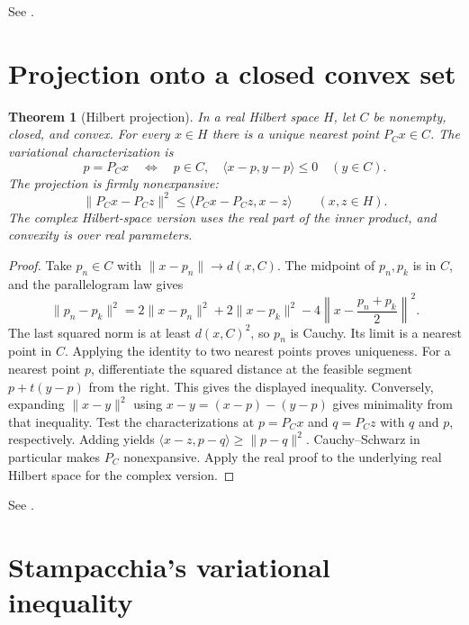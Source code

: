 \documentclass[11pt,oneside,openany]{book}
\theoremstyle{plain}
\newtheorem{theorem}{Theorem}[chapter]
\theoremstyle{definition}
\theoremstyle{remark}
\begin{document}
See \cite[Chapter I, Section 6]{EkelandTemam}.

\section{Projection onto a closed convex set}
\label{v03-05}

\begin{theorem}[Hilbert projection]
\label{thm:hilbert-projection}
In a real Hilbert space \(H\), let \(C\) be nonempty, closed, and convex.
For every \(x\in H\) there is a unique nearest point \(P_C x\in C\).
The variational characterization is
\[
 p=P_Cx
 \quad\Longleftrightarrow\quad
 p\in C,\quad \langle x-p,y-p\rangle\le0\quad(y\in C).
\]
The projection is firmly nonexpansive:
\[
 \|P_Cx-P_Cz\|^2\le \langle P_Cx-P_Cz,x-z\rangle \qquad(x,z\in H).
\]
The complex Hilbert-space version uses the real part of the inner
product, and convexity is over real parameters.
\end{theorem}
\begin{proof}
Take \(p_n\in C\) with \(\|x-p_n\|\to d(x,C)\).
The midpoint of \(p_n,p_k\) is in \(C\), and the parallelogram law gives
\[
 \|p_n-p_k\|^2
 =2\|x-p_n\|^2+2\|x-p_k\|^2
       -4\left\|x-\frac{p_n+p_k}{2}\right\|^2.
\]
The last squared norm is at least \(d(x,C)^2\), so \(p_n\) is Cauchy.
Its limit is a nearest point in \(C\). Applying the identity to two
nearest points proves uniqueness. For a nearest point \(p\), differentiate
the squared distance at the feasible segment \(p+t(y-p)\) from the right.
This gives the displayed inequality. Conversely, expanding
\(\|x-y\|^2\) using \(x-y=(x-p)-(y-p)\) gives minimality from that
inequality. Test the characterizations at \(p=P_Cx\) and \(q=P_Cz\)
with \(q\) and \(p\), respectively. Adding yields
\(\langle x-z,p-q\rangle\ge\|p-q\|^2\).
Cauchy--Schwarz in particular makes \(P_C\) nonexpansive.
Apply the real proof to the underlying real Hilbert space for the
complex version.
\end{proof}

See \cite[Section 5.1]{Brezis}.

\section{Stampacchia's variational inequality}
\label{v03-06}
\end{document}
